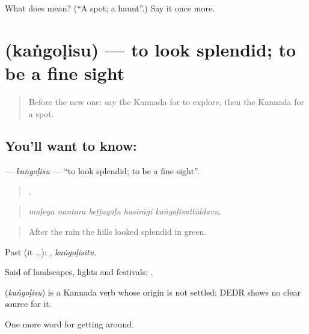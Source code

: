 \begin{tcolorbox}[breakable,colback=teal!4,colframe=teal!35!black,title={Before you move on}]
What does  mean? (\textquotedblleft{}A spot; a haunt\textquotedblright{}.) Say it once more.
\end{tcolorbox}
\section[\texorpdfstring{\kn{ಕಂಗೊಳಿಸು} (kaṅgoḷisu)}{ಕಂಗೊಳಿಸು (kaṅgoḷisu)}]{ (kaṅgoḷisu) — to look splendid; to be a fine sight}

\label{lesson:KA-C457-kangolisu}



\begin{quote}
Before the new one: say the Kannada for to explore, then the Kannada for a spot.
\end{quote}

\subsection*{You'll want to know: }
\textbf{} — \emph{kaṅgoḷisu} — \textquotedblleft{}to look splendid; to be a fine sight\textquotedblright{}.

\begin{quote}
    .
\end{quote}

\begin{quote}
\emph{maḷeya nantara beṭṭagaḷu hasirāgi kaṅgoḷisuttiddavu.}
\end{quote}

\begin{quote}
After the rain the hills looked splendid in green.
\end{quote}

Past (it …): , \emph{kaṅgoḷisitu}.

Said of landscapes, lights and festivals:   .

\begin{cousinweb}
\textbf{} (\emph{kaṅgoḷisu}) is a Kannada verb whose origin is not settled; DEDR shows no clear source for it.
\end{cousinweb}

\begin{grammarlens}[title={What you've built}]
One more word for getting around.
\end{grammarlens}

